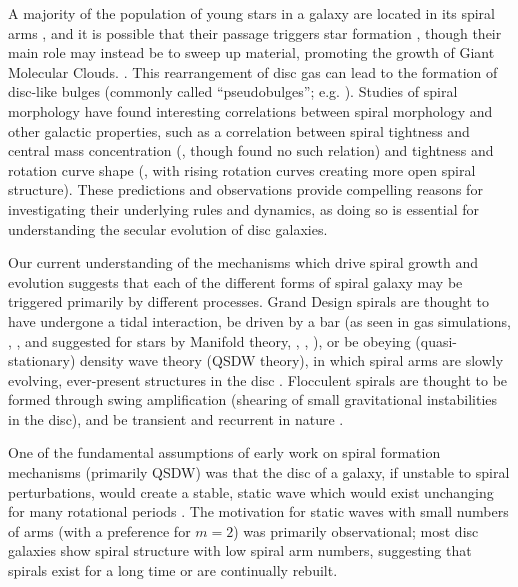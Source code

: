 A majority of the population of young stars in a galaxy are located in its spiral arms \citep{2011EAS....51...19E}, and it is possible that their passage triggers star formation \citep{2013A&A...560A..59C}, though their main role may instead be to sweep up material, promoting the growth of Giant Molecular Clouds. \citep{2014IAUS..298..221D}. This rearrangement of disc gas can lead to the formation of disc-like bulges (commonly called ``pseudobulges''; e.g. \citealt{2004ARA&A..42..603K}). Studies of spiral morphology have found interesting correlations between spiral morphology and other galactic properties, such as a correlation between spiral tightness and central mass concentration (\citealt{2019ApJ...871..194Y}, though \citealt{2017MNRAS.472.2263H} found no such relation) and tightness and rotation curve shape (\citealt{2005MNRAS.359.1065S}, with rising rotation curves creating more open spiral structure). These predictions and observations provide compelling reasons for investigating their underlying rules and dynamics, as doing so is essential for understanding the secular evolution of disc galaxies.

Our current understanding of the mechanisms which drive spiral growth and evolution suggests that each of the different forms of spiral galaxy may be triggered primarily by different processes. Grand Design spirals are thought to have undergone a tidal interaction, be driven by a bar (as seen in gas simulations, \citealt{1976ApJ...209...53S}, \citealt{2008A&A...489..115R}, and suggested for stars by Manifold theory, \citealt{2006A&A...453...39R}, \citealt{2009MNRAS.394...67A}, \citealt{2009MNRAS.400.1706A}), or be obeying (quasi-stationary) density wave theory (QSDW theory), in which spiral arms are slowly evolving, ever-present structures in the disc \citep{1964ApJ...140..646L}. Flocculent spirals are thought to be formed through swing amplification (shearing of small gravitational instabilities in the disc), and be transient and recurrent in nature \citep{1966ApJ...146..810J}.

One of the fundamental assumptions of early work on spiral formation mechanisms (primarily QSDW) was that the disc of a galaxy, if unstable to spiral perturbations, would create a stable, static wave which would exist unchanging for many rotational periods \citep{1964ApJ...140..646L}. The motivation for static waves with small numbers of arms (with a preference for $m=2$) was primarily observational; most disc galaxies show spiral structure with low spiral arm numbers, suggesting that spirals exist for a long time or are continually rebuilt.

